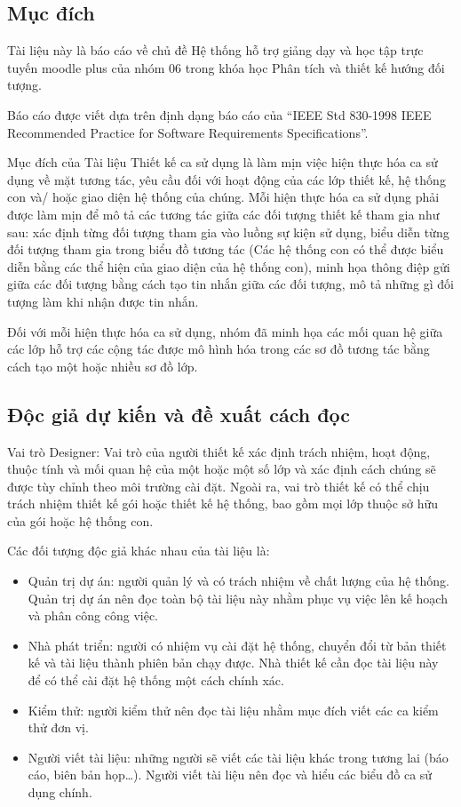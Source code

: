 \documentclass[./../main.tex]{subfiles}
\begin{document}
\subsection{Mục đích}
Tài liệu này là báo cáo về chủ đề Hệ thống hỗ trợ giảng dạy và học tập trực tuyến moodle plus của nhóm 06 trong khóa học Phân tích và thiết kế hướng đối tượng.

Báo cáo được viết dựa trên định dạng báo cáo của  “IEEE Std 830-1998 IEEE Recommended Practice for Software Requirements Specifications”.

Mục đích của Tài liệu Thiết kế ca sử dụng là làm mịn việc hiện thực hóa ca sử dụng về mặt tương tác, yêu cầu đối với hoạt động của các lớp thiết kế, hệ thống con và/ hoặc giao diện hệ thống của chúng.
Mỗi hiện thực hóa ca sử dụng phải được làm mịn để mô tả các tương tác giữa các đối tượng thiết kế tham gia như sau: xác định từng đối tượng tham gia vào luồng sự kiện sử dụng, biểu diễn từng đối tượng tham gia trong biểu đồ  tương tác (Các hệ thống con có thể được biểu diễn bằng các thể hiện của giao diện của hệ thống con), minh họa thông điệp gửi giữa các đối tượng bằng cách tạo tin nhắn giữa các đối tượng, mô tả những gì đối tượng làm khi nhận được tin nhắn.

Đối với mỗi hiện thực hóa ca sử dụng, nhóm đã minh họa các mối quan hệ giữa các lớp hỗ trợ các cộng tác được mô hình hóa trong các sơ đồ tương tác bằng cách tạo một hoặc nhiều sơ đồ lớp.

\subsection{Độc giả dự kiến và đề xuất cách đọc}

Vai trò Designer: Vai trò của người thiết kế xác định trách nhiệm, hoạt động, thuộc tính và mối quan hệ của một hoặc một số lớp và xác định cách chúng sẽ được tùy chỉnh theo môi trường cài đặt. Ngoài ra, vai trò thiết kế có thể chịu trách nhiệm thiết kế gói hoặc thiết kế hệ thống, bao gồm mọi lớp thuộc sở hữu của gói hoặc hệ thống con.

Các đối tượng độc giả khác nhau của tài liệu là:
\begin{itemize}
    \item Quản trị dự án: người quản lý và có trách nhiệm về chất lượng của hệ thống. Quản trị dự án nên đọc toàn bộ tài liệu này nhằm phục vụ việc lên kế hoạch và phân công công việc.
    \item Nhà phát triển: người có nhiệm vụ cài đặt hệ thống, chuyển đổi từ bản thiết kế và tài liệu thành phiên bản chạy được. Nhà thiết kế cần đọc tài liệu này để có thể cài đặt hệ thống một cách chính xác.
    \item Kiểm thử: người kiểm thử nên đọc tài liệu nhằm mục đích viết các ca kiểm thử đơn vị.
    \item Người viết tài liệu: những người sẽ viết các tài liệu khác trong tương lai (báo cáo, biên bản họp…). Người viết tài liệu nên đọc và hiểu các biểu đồ ca sử dụng chính.
\end{itemize}
\end{document}
